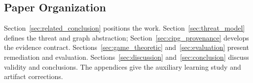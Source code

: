 \subsection{Paper Organization}
Section~\ref{sec:related_conclusion} positions the work. Section~\ref{sec:threat_model} defines the threat and graph abstraction; Section~\ref{sec:cipg_provenance} develops the evidence contract. Sections~\ref{sec:game_theoretic} and~\ref{sec:evaluation} present remediation and evaluation. Sections~\ref{sec:discussion} and~\ref{sec:conclusion} discuss validity and conclusions. The appendices give the auxiliary learning study and artifact corrections.
